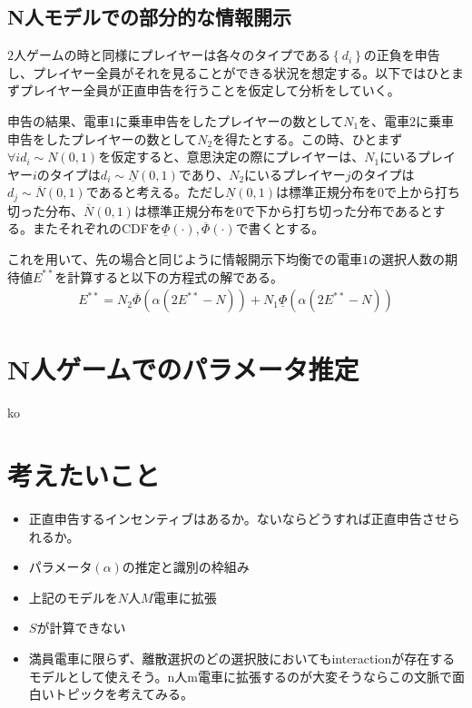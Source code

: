 \documentclass{jsarticle}
\begin{document}
\subsection{N人モデルでの部分的な情報開示}
$2$人ゲームの時と同様にプレイヤーは各々のタイプである$\left\{ d_i \right\}$の正負を申告し、プレイヤー全員がそれを見ることができる状況を想定する。以下ではひとまずプレイヤー全員が正直申告を行うことを仮定して分析をしていく。

申告の結果、電車$1$に乗車申告をしたプレイヤーの数として$N_1$を、電車$2$に乗車申告をしたプレイヤーの数として$N_2$を得たとする。この時、ひとまず$\forall i d_i \sim N(0,1)$を仮定すると、意思決定の際にプレイヤーは、$N_1$にいるプレイヤー$i$のタイプは$d_i \sim \underline{N}(0,1)$であり、$N_2$にいるプレイヤー$j$のタイプは$d_j \sim \overline{N}(0,1)$であると考える。ただし$\underline{N}(0,1)$は標準正規分布を$0$で上から打ち切った分布、$\overline{N}(0,1)$は標準正規分布を$0$で下から打ち切った分布であるとする。またそれぞれのCDFを$\underline{\Phi}(\cdot), \overline{\Phi}(\cdot)$で書くとする。

これを用いて、先の場合と同じように情報開示下均衡での電車$1$の選択人数の期待値$E^{**}$を計算すると以下の方程式の解である。
\begin{align*}
	E^{**} = N_2 \overline{\Phi} \left(\alpha (2 E^{**} - N)\right) + N_1 \underline{\Phi} \left(\alpha (2 E^{**} - N)\right)
\end{align*}

\section{N人ゲームでのパラメータ推定}
ko


\section{考えたいこと}
\begin{itemize}
	\item 正直申告するインセンティブはあるか。ないならどうすれば正直申告させられるか。
	\item パラメータ$(\alpha)$の推定と識別の枠組み
	\item 上記のモデルを$N$人$M$電車に拡張
	\item $S$が計算できない
	\item 満員電車に限らず、離散選択のどの選択肢においてもinteractionが存在するモデルとして使えそう。n人m電車に拡張するのが大変そうならこの文脈で面白いトピックを考えてみる。
\end{itemize}
\end{document}
